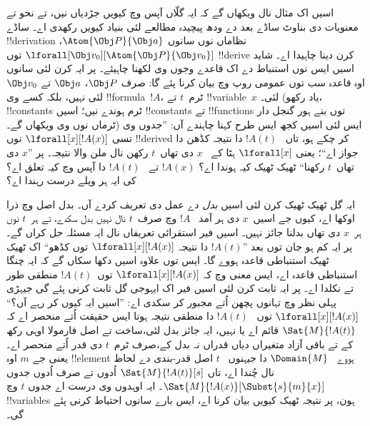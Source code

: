 \documentclass[../../../include/open-logic-section]{subfiles}
\begin{document}


اسیں اک مثال نال ویکھاں گے کہ ایہ گلّاں
آپس وچ کیویں جڑدیاں نیں، تے نحو تے معنویات
دی بناوٹ ساڈے بعد دے ودھ پیچیدہ مطالعے
لئی بنیاد کیویں رکھدی اے۔ ساڈے
!!{derivation} نظاماں نوں سانوں
$\Atom{\Obj P}{\Obj a}$،
$\lforall[\Obj v_0][\Atom{\Obj P}{\Obj v_0}]$
توں !!{derive} کرن دینا چاہیدا اے۔
شاید اسیں ایس نوں استنباط دے اک قاعدے
وجوں وی لکھنا چاہیئے۔ پر ایہ کرن لئی
سانوں اوہ قاعدہ سب توں عمومی روپ وچ
بیان کرنا پئے گا: صرف $\Obj P$،
$\Obj a$ تے $\Obj v_0$ لئی نہیں،
بلکہ کسے وی !!{formula}~$!A$،
ٹرم~$t$ تے !!{variable}~$x$ لئی۔
(یاد رکھو، !!{constant}s ٹرم ہوندے
نیں؛ اسیں !!{constant}s تے
!!{function}s توں بنے ہور گنجل دار
ٹرماں نوں وی ویکھاں گے۔)
ایس لئی اسیں کجھ ایس طرح کہنا
چاہندے آں: ”جدوں وی تسی
$\lforall[x][!A(x)]$ نوں
!!{derive}d کر چکے ہو، تاں
~$!A(t)$ دا نتیجہ کڈھن دا جواز اے“؛
یعنی $\lforall[x]$ ہٹا کے
~$x$ دی تھاں~$t$ رکھن نال
ملن والا نتیجہ۔ پر ”$x$ دی
تھاں~$t$ رکھنا“ ٹھیک ٹھیک کیہ
ہوندا اے؟ $!A(x)$ تے
~$!A(t)$ دا آپس وچ کیہ
تعلق اے؟ کی ایہ ہر ویلے
درست رہندا اے؟

ایہ گل ٹھیک ٹھیک کرن لئی اسیں
\emph{بدل} دے عمل دی تعریف کردے آں۔
بدل اصل وچ ذرا اوکھا اے، کیوں جے
اسیں~$x$ دی ہر آمد
~$!A$ وچ صرف~$t$ نال نہیں بدل سکدے،
تے ہر~$t$ نوں ہر~$x$ دی
تھاں بدلنا جائز نہیں۔ اسیں فیر
استقرائی تعریفاں نال ایہ مسئلہ
حل کراں گے۔ پر ایہ کم ہو جان
توں بعد ”$!A(t)$ دا نتیجہ
$\lforall[x][!A(x)]$ توں کڈھو“
اک ٹھیک ٹھیک استنباطی قاعدہ
ہووے گا۔ ایس توں علاوہ اسیں
دکھا سکاں گے کہ ایہ چنگا
استنباطی قاعدہ اے، ایس معنی
وچ کہ $\lforall[x][!A(x)]$
توں~$!A(t)$ منطقی طور تے
نکلدا اے۔ پر ایہ ثابت کرن
لئی اسیں فیر اک ایہوجی گل
ثابت کرنی پئے گی جیہڑی پہلی
نظر وچ تہانوں پچھن اُتے
مجبور کر سکدی اے: ”اسیں
ایہ کیوں کر رہے آں؟“
$\lforall[x][!A(x)]$ توں
~$!A(t)$ دا منطقی نتیجہ
ہونا ایس حقیقت اُتے منحصر
اے کہ $\Sat{M}{!A(t)}$
قائم اے یا نہیں، ایہ جائز بدل لئی،ساخت تے اصل فارمولا
اوہی رکھ کے تے باقی آزاد متغیراں دیاں قدراں نہ بدل کے،صرف
ٹرم~$t$ دی قدر اُتے
منحصر اے۔ یعنی جے
$m$ اوہ !!{element} ہووے
~$\Domain{M}$ دا جیہنوں
~$t$ اصل قدر-بندی دے لحاظ نال چُندا اے، تاں
$\Sat{M}{!A(t)}[s]$ اُدوں
تے صرف اُدوں جدوں
$\Sat{M}{!A(x)}[\Subst{s}{m}{x}]$۔
ایہ اوہدوں وی درست اے
جدوں $t$ وچ !!{variable}s
ہون، پر نتیجہ ٹھیک کیویں
بیان کرنا اے، ایس بارے
سانوں احتیاط کرنی پئے گی۔
\end{document}

